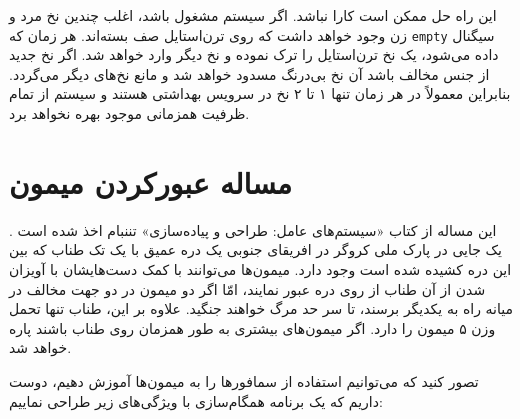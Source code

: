 \documentclass{book}
\begin{document}
    این راه حل ممکن است کارا نباشد. اگر سیستم مشغول باشد، اغلب چندین نخ مرد و زن وجود خواهد داشت که روی ترن‌استایل صف بسته‌اند. 
    هر زمان که {\tt empty} سیگنال داده می‌شود، یک نخ ترن‌استایل را ترک نموده و نخ دیگر وارد خواهد شد. اگر نخ جدید از جنس مخالف باشد 
    آن نخ بی‌درنگ مسدود خواهد شد و مانع نخ‌های دیگر می‌گردد. بنابراین معمولاً  در هر زمان تنها ۱ تا ۲ نخ در سرویس بهداشتی هستند و سیستم از تمام 
    ظرفیت همزمانی موجود بهره نخواهد برد. 


\section{مساله عبورکردن میمون}

    این مساله از کتاب «سیستم‌های عامل: طراحی و پیاده‌سازی» تننبام اخذ شده است \cite{tanenbaum}.
    یک جایی در پارک ملی کروگر در افریقای جنوبی
    یک دره عمیق با یک تک طناب که بین این دره کشیده شده است وجود دارد. میمون‌ها می‌توانند با کمک دست‌هایشان با آویزان شدن از آن طناب 
    از روی دره عبور نمایند، امّا اگر دو میمون در دو جهت مخالف در میانه راه به یکدیگر برسند، تا سر حد مرگ خواهند جنگید. 
    علاوه بر این،‌ طناب تنها تحمل وزن ۵ میمون را دارد. اگر میمون‌های بیشتری به طور همزمان روی طناب باشند پاره خواهد شد. 

    تصور کنید که می‌توانیم  استفاده از سمافورها را به میمون‌ها آموزش دهیم، دوست داریم که یک برنامه همگام‌سازی با ویژگی‌های زیر طراحی نماییم:
\end{document}
